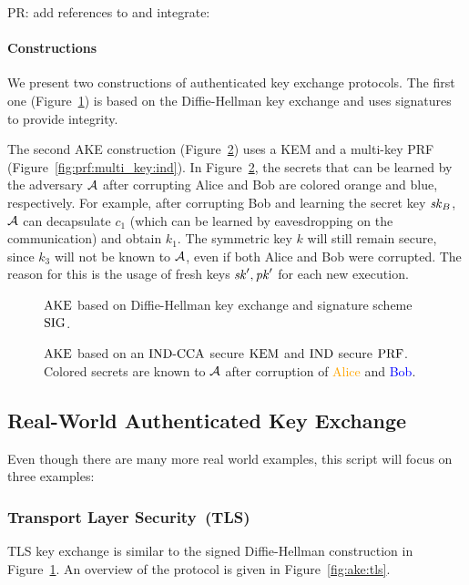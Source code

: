 \alert{PR: add references to and integrate: \cite{RSA:PRSS21,EPRINT:BCJSW24}}

\paragraph{Constructions} We present two constructions of authenticated key exchange protocols. 
The first one (Figure~\ref{fig:ake:signed_dh}) is based on the Diffie-Hellman key exchange and uses signatures to provide integrity.

The second AKE construction (Figure~\ref{fig:ake:kem}) uses a KEM and a multi-key PRF (Figure~\ref{fig:prf:multi_key:ind}). 
In Figure~\ref{fig:ake:kem}, the secrets that can be learned by the adversary $\mathcal{A}$ after corrupting Alice and Bob are colored orange and blue, respectively.
For example, after corrupting Bob and learning the secret key $\mathit{sk}_B$, $\mathcal{A}$ can decapsulate $c_1$ (which can be learned by eavesdropping on the communication) and obtain $k_1$.
The symmetric key $k$ will still remain secure, since $k_3$ will not be known to $\mathcal{A}$, even if both Alice and Bob were corrupted.
The reason for this is the usage of fresh keys $\mathit{sk}',\mathit{pk}'$ for each new execution.

\begin{figure}[!ht]
    \centering
    
    \caption{$\mathrm{AKE}$ based on Diffie-Hellman key exchange and signature scheme $\mathrm{SIG}$.}
    \label{fig:ake:signed_dh}
\end{figure}

\begin{figure}[!ht]
    \centering
    
    \caption{$\mathrm{AKE}$ based on an ${\mathrm{IND}\text{-}\mathrm{CCA}}$ secure $\mathrm{KEM}$ and ${\mathrm{IND}}$ secure $\mathrm{PRF}$. Colored secrets are known to $\mathcal{A}$ after corruption of \textcolor{orange}{Alice} and \textcolor{blue}{Bob}.}
    \label{fig:ake:kem}
\end{figure}

\subsection{Real-World Authenticated Key Exchange}
Even though there are many more real world examples, this script will focus on three examples:

\subsubsection{Transport Layer Security~(TLS)}
TLS key exchange is similar to the signed Diffie-Hellman construction in Figure~\ref{fig:ake:signed_dh}.
An overview of the protocol is given in Figure~\ref{fig:ake:tls}.

